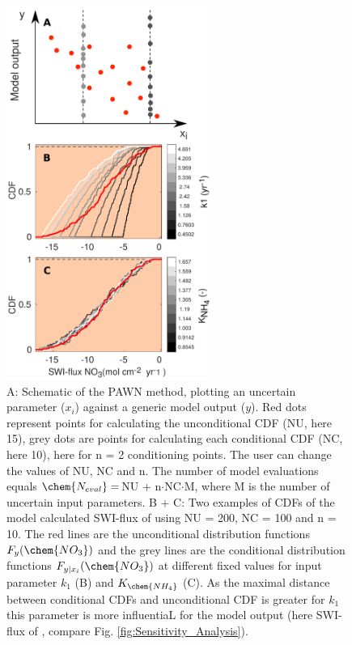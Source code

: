 \documentclass[gmd, manuscript]{copernicus}
\begin{document}
\begin{figure}[htbp]
\begin{center}
	\includegraphics[width=0.6\textwidth]{figures/SA/00_CDFs_400m_NO_3_1807.pdf}
	\caption{A: Schematic of the PAWN method, plotting an uncertain parameter ($x_i$) against a generic model output ($y$). 
	Red dots represent points for calculating the unconditional CDF (NU, here 15), grey dots are points for calculating each conditional CDF (NC, here 10), here for 
	n = 2 conditioning points. The user can change the values of NU, NC and n. The number of model evaluations equals $\chem{N_{eval}} = $NU + n$\cdot$NC$\cdot$M, 
	where M is the number of uncertain input parameters. 
	B + C: Two examples of CDFs of the model calculated SWI-flux of  using NU = 200, NC = 100 and n = 10. 
	The red lines are the unconditional distribution functions $F_y(\chem{NO_3})$ and the grey lines are the conditional distribution functions $F_{y|x_i}(\chem{NO_3})$ 
	at different fixed values for input parameter $k_1$ (B) and $K_{\chem{NH_4}}$ (C). 
	As the maximal distance between conditional CDFs and unconditional CDF is greater for $k_1$ this parameter is more influentiaL for the model output 
	(here SWI-flux of , compare Fig. \ref{fig:Sensitivity_Analysis}). 
	}
	\label{fig:Sensitivity_Analysis_methodology}
	\end{center}
\end{figure}
\end{document}
